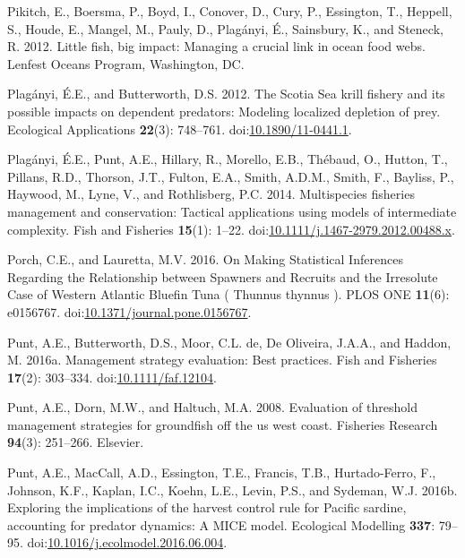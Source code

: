 \documentclass[]{article}
\begin{document}
\hypertarget{ref-pikitch_lenfest_2012}{}
Pikitch, E., Boersma, P., Boyd, I., Conover, D., Cury, P., Essington,
T., Heppell, S., Houde, E., Mangel, M., Pauly, D., Plagányi, É.,
Sainsbury, K., and Steneck, R. 2012. Little fish, big impact: Managing a
crucial link in ocean food webs. Lenfest Oceans Program, Washington, DC.

\hypertarget{ref-plaganyi_scotia_2012}{}
Plagányi, É.E., and Butterworth, D.S. 2012. The Scotia Sea krill fishery
and its possible impacts on dependent predators: Modeling localized
depletion of prey. Ecological Applications \textbf{22}(3): 748--761.
doi:\href{https://doi.org/10.1890/11-0441.1}{10.1890/11-0441.1}.

\hypertarget{ref-plaganyi_multispecies_2014}{}
Plagányi, É.E., Punt, A.E., Hillary, R., Morello, E.B., Thébaud, O.,
Hutton, T., Pillans, R.D., Thorson, J.T., Fulton, E.A., Smith, A.D.M.,
Smith, F., Bayliss, P., Haywood, M., Lyne, V., and Rothlisberg, P.C.
2014. Multispecies fisheries management and conservation: Tactical
applications using models of intermediate complexity. Fish and Fisheries
\textbf{15}(1): 1--22.
doi:\href{https://doi.org/10.1111/j.1467-2979.2012.00488.x}{10.1111/j.1467-2979.2012.00488.x}.

\hypertarget{ref-porch_making_2016}{}
Porch, C.E., and Lauretta, M.V. 2016. On Making Statistical Inferences
Regarding the Relationship between Spawners and Recruits and the
Irresolute Case of Western Atlantic Bluefin Tuna ( Thunnus thynnus ).
PLOS ONE \textbf{11}(6): e0156767.
doi:\href{https://doi.org/10.1371/journal.pone.0156767}{10.1371/journal.pone.0156767}.

\hypertarget{ref-punt_management_2016}{}
Punt, A.E., Butterworth, D.S., Moor, C.L. de, De Oliveira, J.A.A., and
Haddon, M. 2016a. Management strategy evaluation: Best practices. Fish
and Fisheries \textbf{17}(2): 303--334.
doi:\href{https://doi.org/10.1111/faf.12104}{10.1111/faf.12104}.

\hypertarget{ref-punt2008evaluation}{}
Punt, A.E., Dorn, M.W., and Haltuch, M.A. 2008. Evaluation of threshold
management strategies for groundfish off the us west coast. Fisheries
Research \textbf{94}(3): 251--266. Elsevier.

\hypertarget{ref-punt_exploring_2016}{}
Punt, A.E., MacCall, A.D., Essington, T.E., Francis, T.B.,
Hurtado-Ferro, F., Johnson, K.F., Kaplan, I.C., Koehn, L.E., Levin,
P.S., and Sydeman, W.J. 2016b. Exploring the implications of the harvest
control rule for Pacific sardine, accounting for predator dynamics: A
MICE model. Ecological Modelling \textbf{337}: 79--95.
doi:\href{https://doi.org/10.1016/j.ecolmodel.2016.06.004}{10.1016/j.ecolmodel.2016.06.004}.
\end{document}
